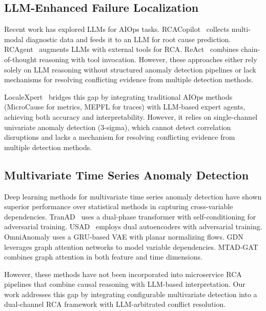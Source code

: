\documentclass[a4paper,fleqn]{cas-dc}
\begin{document}
\subsection{LLM-Enhanced Failure Localization}

Recent work has explored LLMs for AIOps tasks.  RCACopilot~\cite{10.1145/3627703.3629553} collects multi-modal diagnostic data and feeds it to an LLM for root cause prediction.  RCAgent~\cite{10.1145/3627673.3680016} augments LLMs with external tools for RCA.  ReAct~\cite{DBLP:conf/iclr/YaoZYDSN023} combines chain-of-thought reasoning with tool invocation.  However, these approaches either rely solely on LLM reasoning without structured anomaly detection pipelines or lack mechanisms for resolving conflicting evidence from multiple detection methods.

LocaleXpert~\cite{11449471} bridges this gap by integrating traditional AIOps methods (MicroCause for metrics, MEPFL for traces) with LLM-based expert agents, achieving both accuracy and interpretability.  However, it relies on single-channel univariate anomaly detection (3-sigma), which cannot detect correlation disruptions and lacks a mechanism for resolving conflicting evidence from multiple detection methods.

\subsection{Multivariate Time Series Anomaly Detection}

Deep learning methods for multivariate time series anomaly detection have shown superior performance over statistical methods in capturing cross-variable dependencies.  TranAD~\cite{DBLP:journals/pvldb/TuliCJ22} uses a dual-phase transformer with self-conditioning for adversarial training.  USAD~\cite{10.1145/3394486.3403392} employs dual autoencoders with adversarial training.  OmniAnomaly \cite{10.1145/3292500.3330672} uses a GRU-based VAE with planar normalizing flows.  GDN~\cite{deng2021graph} leverages graph attention networks to model variable dependencies.  MTAD-GAT~\cite{10.1109/ICDM50108.2020.00093} combines graph attention in both feature and time dimensions.

However, these methods have not been incorporated into microservice RCA pipelines that combine causal reasoning with LLM-based interpretation.  Our work addresses this gap by integrating configurable multivariate detection into a dual-channel RCA framework with LLM-arbitrated conflict resolution.
\end{document}
